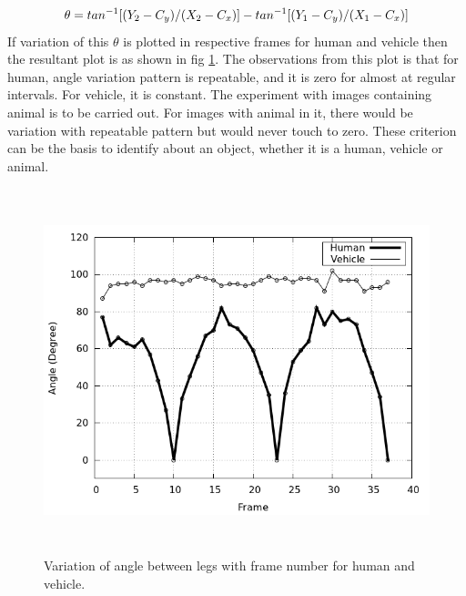 \begin{enumerate}
%
	\begin{equation}
	\theta = tan^{-1}[(Y_2 - C_y) / (X_2 - C_x)] \\ - tan^{-1}[(Y_1 - C_y) / (X_1 - C_x)]
	\end{equation}
%
\indent If variation of this $\theta$ is plotted in respective frames
for human and vehicle then the resultant plot is as shown in fig
\ref{angle_plot}. The observations from this plot is that for human,
angle variation pattern is repeatable, and it is zero for almost at
regular intervals. For vehicle, it is constant. The experiment with
images containing animal is to be carried out. For images with animal in
it, there would be variation with repeatable pattern but would never
touch to zero. These criterion can be the basis to identify about an
object, whether it is a human, vehicle or animal.

\begin{figure}[!b]
\centering
\includegraphics[height=300pt]{Figures/angle_plot}
\caption{Variation of angle between legs with frame number for human and
vehicle.}
\label{angle_plot}
\end{figure}


\end{enumerate}

